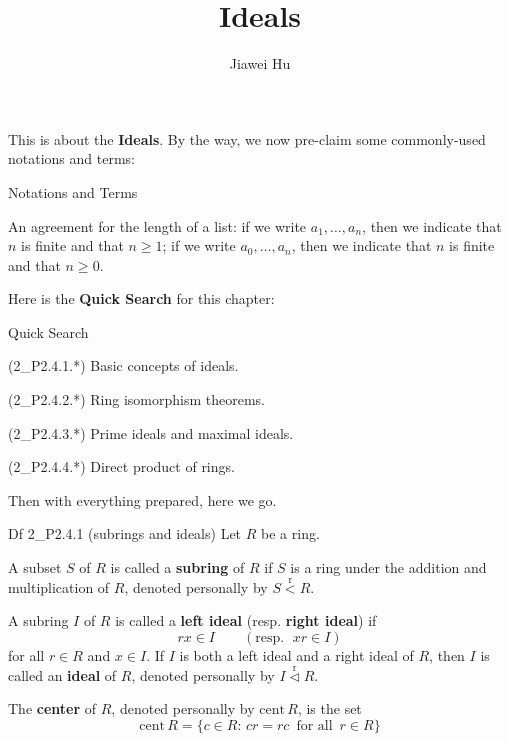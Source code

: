 \documentclass{article}
\title{\LARGE \textbf{Ideals}}
\author{\large Jiawei Hu}
\newcommand{\nles}{\vartriangleleft}
\newcommand{\subr}{\overset{\text{r}}{<}} %
\newcommand{\ideal}{\overset{\text{r}}{\nles}} %
\newcommand{\cent}{\text{cent}\,} %
\begin{document}
\maketitle

This is about the \textbf{Ideals}. By the way, we now pre-claim some commonly-used notations and terms:
\begin{Df}{Notations and Terms}
    \begin{compactenum}
        \item An agreement for the length of a list: if we write $a_1, \dots, a_n$, then we indicate that $n$ is finite and that $n\geq 1$; if we write $a_0, \dots, a_n$, then we indicate that $n$ is finite and that $n\geq 0$.
    \end{compactenum}
\end{Df}

Here is the \textbf{Quick Search} for this chapter:
\begin{Th}{Quick Search}
    \begin{compactdesc}
        \item (2\_P2.4.1.*) Basic concepts of ideals.
        \item (2\_P2.4.2.*) Ring isomorphism theorems.
        \item (2\_P2.4.3.*) Prime ideals and maximal ideals.
        \item (2\_P2.4.4.*) Direct product of rings.
    \end{compactdesc}
\end{Th}

Then with everything prepared, here we go. 

\begin{Df}{Df 2\_P2.4.1 (subrings and ideals)}
    Let $R$ be a ring. 
    \begin{compactenum}
        \item A subset $S$ of $R$ is called a \textbf{subring} of $R$ if $S$ is a ring under the addition and multiplication of $R$, denoted personally by $S\subr R$.
        \item A subring $I$ of $R$ is called a \textbf{left ideal} (resp. \textbf{right ideal}) if
        $$ rx\in I \qquad (\text{resp. }\; xr\in I) $$
        for all $r\in R$ and $x\in I$. If $I$ is both a left ideal and a right ideal of $R$, then $I$ is called an \textbf{ideal} of $R$, denoted personally by $I\ideal R$.
        \item The \textbf{center} of $R$, denoted personally by $\cent R$, is the set
        $$ \cent R = \{c\in R:\, cr = rc \,\text{ for all }\, r\in R\} $$ 
    \end{compactenum}
\end{Df}
\end{document}
